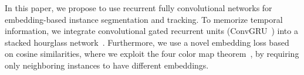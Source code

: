 \documentclass[runningheads,a4paper]{llncs}
\begin{document}
In this paper, we propose to use recurrent fully convolutional networks for embedding-based instance segmentation and tracking.
To memorize temporal information, we integrate convolutional gated recurrent units (\mbox{ConvGRU}~\cite{Ballas2015}) into a stacked hourglass network~\cite{Newell2016}. %
Furthermore, we use a novel embedding loss based on cosine similarities, where we exploit the four color map theorem~\cite{Appel1976}, by requiring only neighboring instances to have different embeddings.
\end{document}
